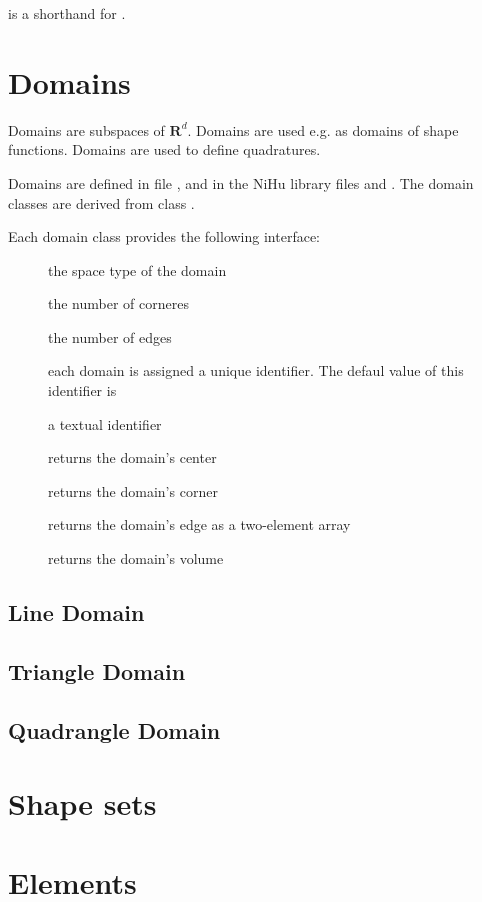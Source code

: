  is a shorthand for .


\section{Domains}
\label{sec:domain}

Domains are subspaces of $\mathbf{R}^d$.
Domains are used e.g. as domains of shape functions.
Domains are used to define quadratures.

Domains are defined in file , and in the NiHu library files  and .
The domain classes are derived from class .

Each domain class provides the following interface:

\begin{description}
	\item[] the space type of the domain
	\item[] the number of corneres
	\item[] the number of edges
	\item[] each domain is assigned a unique identifier.
	The defaul value of this identifier is 
	\item[] a textual identifier
	
	\item[] returns the domain's center
	\item[] returns the domain's corner
	\item[] returns the domain's edge as a two-element array
	\item[] returns the domain's volume
\end{description}



\subsection{Line Domain}

\subsection{Triangle Domain}

\subsection{Quadrangle Domain}

\section{Shape sets}

\section{Elements}
